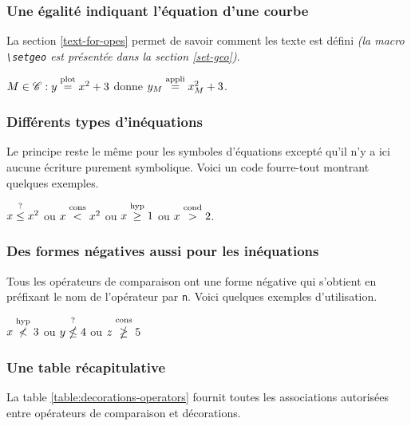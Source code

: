 \documentclass[12pt,a4paper]{article}
\newcommand\env[1]{\texttt{#1}}
\newcommand\macro[1]{\env{\textbackslash{}#1}}
\theoremstyle{definition}
\begin{document}
\subsubsection{Une égalité indiquant l'équation d'une courbe}

La section \ref{text-for-opes} permet de savoir comment les texte \emph{\og \textopplot \fg} est défini \emph{(la macro \emph{\macro{setgeo}} est présentée dans la section \ref{set-geo})}.

\begin{latexex}
$M \in \setgeo{C}: y \eqplot x^2 + 3$
donne
$y_M \eqappli x_M^2 + 3$.
\end{latexex}




\subsubsection{Différents types d'inéquations}

Le principe reste le même pour les symboles d'équations excepté qu'il n'y a ici aucune écriture purement symbolique. Voici un code \og fourre-tout \fg{} montrant quelques exemples.

\begin{latexex}
$x \leqtest x^2$ ou $x \lesscons x^2$ ou
$x \geqhyp 1$    ou $x \gtrcond 2$.
\end{latexex}




\subsubsection{Des formes négatives aussi pour les inéquations}

Tous les opérateurs de comparaison ont une forme négative qui s'obtient en préfixant le nom de l'opérateur par \verb+n+.
Voici quelques exemples d'utilisation.

\begin{latexex}
$x \nlesshyp 3$ ou
$y \nleqtest 4$ ou
$z \ngeqcons 5$
\end{latexex}




\subsubsection{Une table récapitulative}

La table \ref{table:decorations-operators}  fournit toutes les associations autorisées entre opérateurs de comparaison et décorations.
\end{document}
